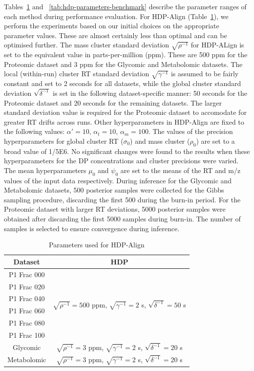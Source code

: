 Tables~\ref{tab:hdp-parameters-hdpalign} and ~\ref{tab:hdp-parameters-benchmark} describe the parameter ranges of each method during performance evaluation. For HDP-Align (Table~\ref{tab:hdp-parameters-hdpalign}), we perform the experiments based on our initial choices on the appropriate parameter values. These are almost certainly less than optimal and can be optimised further. The mass cluster standard deviation $\sqrt{\rho^{-1}}$ for HDP-ALign is set to the equivalent value in parts-per-million (ppm). These are 500 ppm for the Proteomic dataset and 3 ppm for the Glycomic and Metabolomic datasets. The local (within-run) cluster \ac{RT} standard deviation $\sqrt{\gamma^{-1}}$ is assumed to be fairly constant and set to 2 seconds for all datasets, while the global cluster standard deviation $\sqrt{\delta^{-1}}$ is set in the following dataset-specific manner: 50 seconds for the Proteomic dataset and 20 seconds for the remaining datasets. The larger standard deviation value is required for the Proteomic dataset to accomodate for greater \ac{RT} drifts across runs. Other hyperparameters in HDP-Align are fixed to the following values: $\alpha'=10$, $\alpha_t=10$, $\alpha_m=100$. The values of the precision hyperparameters for global cluster RT ($\sigma_0$) and mass cluster ($\rho_0$) are set to a broad value of 1/5E6. No significant changes were found to the results when these hyperparameters for the DP concentrations and cluster precisions were varied. The mean hyperparameters $\mu_0$ and $\psi_0$ are set to the means of the RT and m/z values of the input data respectively. During inference for the Glycomic and Metabolomic datasets, 500 posterior samples were collected for the Gibbs sampling procedure, discarding the first 500 during the burn-in period. For the Proteomic dataset with larger RT deviations, 5000 posterior samples were obtained after discarding the first 5000 samples during burn-in. The number of samples is selected to ensure convergence during inference.

\begin{table}[!htbp]
\begin{centering}
\begin{tabular}{|c|c|}
\hline 
Dataset & HDP\tabularnewline
\hline 
\hline 
P1 Frac 000 & \multirow{6}{*}{$\sqrt{\rho^{-1}}=500$ ppm, $\sqrt{\gamma^{-1}}=2$ s, $\sqrt{\delta^{-1}}=50$
s}\tabularnewline
\cline{1-1} 
P1 Frac 020 & \tabularnewline
\cline{1-1} 
P1 Frac 040 & \tabularnewline
\cline{1-1} 
P1 Frac 060 & \tabularnewline
\cline{1-1} 
P1 Frac 080 & \tabularnewline
\cline{1-1} 
P1 Frac 100 & \tabularnewline
\hline 
Glycomic & $\sqrt{\rho^{-1}}=3$ ppm, $\sqrt{\gamma^{-1}}=2$ s, $\sqrt{\delta^{-1}}=20$
s\tabularnewline
\hline 
Metabolomic & $\sqrt{\rho^{-1}}=3$ ppm, $\sqrt{\gamma^{-1}}=2$ s, $\sqrt{\delta^{-1}}=20$
s\tabularnewline
\hline 
\end{tabular}
\par\end{centering}
\caption{Parameters used for HDP-Align\label{tab:hdp-parameters-hdpalign}}
\end{table}


